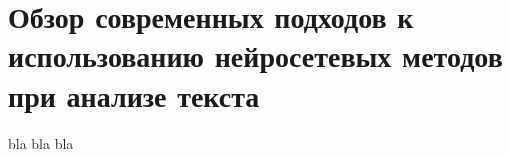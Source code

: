 \section{Обзор современных подходов к использованию нейросетевых методов при анализе текста} \label{literature}


bla bla bla

\clearpage
